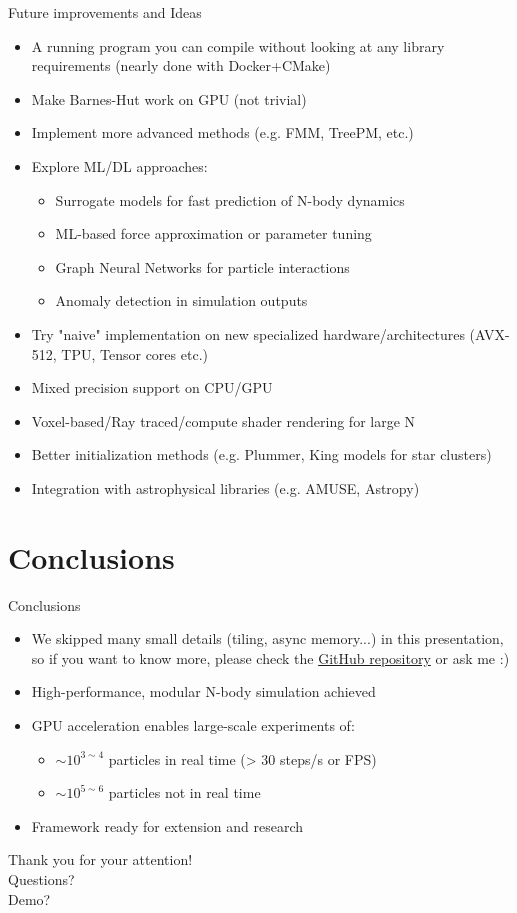 \documentclass{beamer}
\begin{document}
\begin{frame}{Future improvements and Ideas}
    \begin{itemize}
        \item A running program you can compile without looking at any library requirements (nearly done with Docker+CMake)
        \item Make Barnes-Hut work on GPU (not trivial)
        \item Implement more advanced methods (e.g. FMM, TreePM, etc.)
        \item Explore ML/DL approaches: 
            \begin{itemize}
                \item Surrogate models for fast prediction of N-body dynamics
                \item ML-based force approximation or parameter tuning
                \item Graph Neural Networks for particle interactions
                \item Anomaly detection in simulation outputs
            \end{itemize}
        \item Try "naive" implementation on new specialized hardware/architectures (AVX-512, TPU, Tensor cores etc.)
        \item Mixed precision support on CPU/GPU
        \item Voxel-based/Ray traced/compute shader rendering for large N
        \item Better initialization methods (e.g. Plummer, King models for star clusters)
        \item Integration with astrophysical libraries (e.g. AMUSE, Astropy)
    \end{itemize}
\end{frame}

\section{Conclusions}
\begin{frame}{Conclusions}
    \begin{itemize}
        \item We skipped many small details (tiling, async memory...) in this presentation, so if you want to know more, please check the \href{https://github.com/tusca99/N-body-simulation.git}{GitHub repository} or ask me :)
        \item High-performance, modular N-body simulation achieved
        \item GPU acceleration enables large-scale experiments of:
            \begin{itemize}
            \item $\sim 10^{3 \sim 4}$ particles in real time (> 30 steps/s or FPS)
            \item $\sim 10^{5 \sim 6}$ particles not in real time
            \end{itemize}
        \item Framework ready for extension and research
    \end{itemize}
\end{frame}

\begin{emptyframe}
    \centering
    Thank you for your attention! \\
    Questions? \\
    Demo?
\end{emptyframe}
\end{document}
